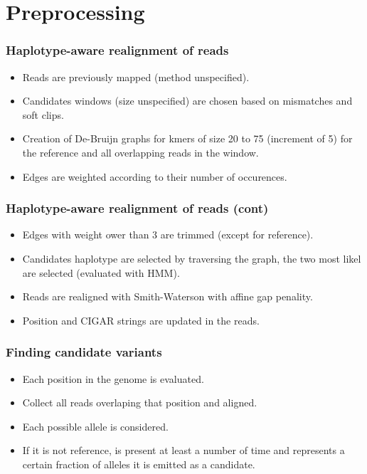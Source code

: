 \documentclass{beamer}
\begin{document}
\section{Preprocessing}

\begin{frame}
    \frametitle{Haplotype-aware realignment of reads}

    \begin{itemize}
        \item Reads are previously mapped (method unspecified).
        \item Candidates windows (size unspecified) are chosen based on mismatches and soft clips.
        \item Creation of De-Bruijn graphs for kmers of size 20 to 75 (increment of 5) for the
              reference and all overlapping reads in the window.
        \item Edges are weighted according to their number of occurences.
    \end{itemize}
\end{frame}

\begin{frame}
    \frametitle{Haplotype-aware realignment of reads (cont)}

    \begin{itemize}
        \item Edges with weight ower than 3 are trimmed (except for reference).
        \item Candidates haplotype are selected by traversing the graph, the two most likel are
              selected (evaluated with HMM).
        \item Reads are realigned with Smith-Waterson with affine gap penality.
        \item Position and CIGAR strings are updated in the reads.
    \end{itemize}
\end{frame}

\begin{frame}
    \frametitle{Finding candidate variants}

    \begin{itemize}
        \item Each position in the genome is evaluated.
        \item Collect all reads overlaping that position and aligned.
        \item Each possible allele is considered.
        \item If it is not reference, is present at least a number of time and represents a certain
            fraction of alleles it is emitted as a candidate.
    \end{itemize}

\end{frame}
\end{document}
